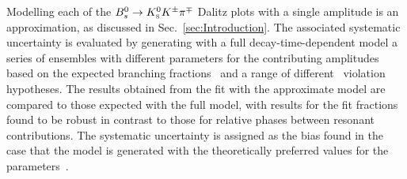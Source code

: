 Modelling each of the ${{B}^0_{s}}\rightarrow{\ensuremath{{K}^0_{\mathrm{ \scriptscriptstyle S}}}}{\ensuremath{{K}^\pm}}{\ensuremath{{\pi}^\mp}}$ Dalitz plots with a single amplitude is an approximation, as discussed in Sec.~\ref{sec:Introduction}.
The associated systematic uncertainty is evaluated by generating with a full decay-time-dependent model a series of ensembles with different parameters for the contributing amplitudes based on the expected branching fractions~\cite{Cheng:2014uga,Li:2014fla} and a range of different \CP\ violation hypotheses.
The results obtained from the fit with the approximate model are compared to those expected with the full model, with results for the fit fractions found to be robust in contrast to those for relative phases between resonant contributions.
The systematic uncertainty is assigned as the bias found in the case that the model is generated with the theoretically preferred values for the parameters~\cite{Cheng:2014uga,Li:2014fla}.
%

